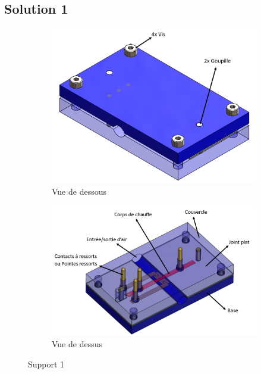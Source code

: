 \subsection{Solution 1}
\begin{figure}[H]
    \hspace{-0.5cm}
    \begin{subfigure}{0.45\textwidth}
        \includegraphics[scale = 0.3]{images/Design1_dessous.png}
        \caption{Vue de dessous}
    \end{subfigure}
    \begin{subfigure}{0.45\textwidth}
        \includegraphics[scale = 0.45]{images/Design1_dessus.png}
        \caption{Vue de dessus}
    \end{subfigure}
    \caption{Support 1}
    \label{fig:solution1}
\end{figure}
